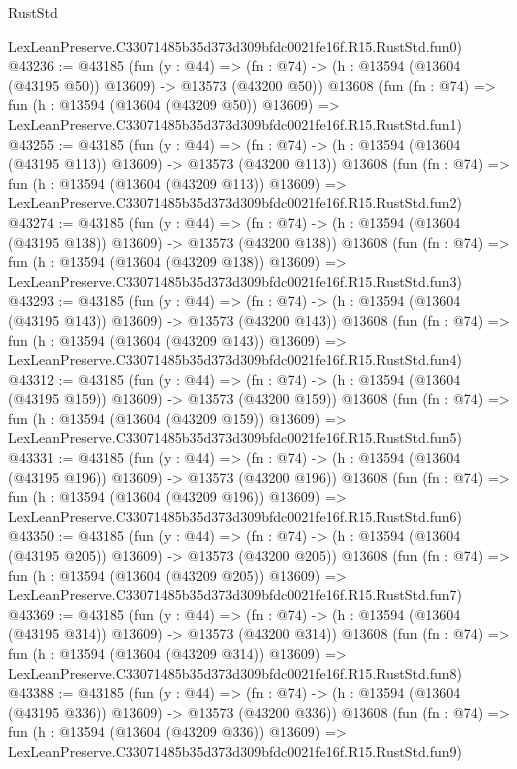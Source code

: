 \begin{lexlean}{RustStd}
\begin{coremodule}
    LexLeanPreserve.C33071485b35d373d309bfdc0021fe16f.R15.RustStd.fun0)
@43236 := @43185
    (fun (y : @44) =>
    (fn : @74) -> (h : @13594 (@13604 (@43195 @50)) @13609) -> @13573 (@43200 @50))
    @13608
    (fun (fn : @74) =>
    fun (h : @13594 (@13604 (@43209 @50)) @13609) =>
    LexLeanPreserve.C33071485b35d373d309bfdc0021fe16f.R15.RustStd.fun1)
@43255 := @43185
    (fun (y : @44) =>
    (fn : @74) -> (h : @13594 (@13604 (@43195 @113)) @13609) -> @13573 (@43200 @113))
    @13608
    (fun (fn : @74) =>
    fun (h : @13594 (@13604 (@43209 @113)) @13609) =>
    LexLeanPreserve.C33071485b35d373d309bfdc0021fe16f.R15.RustStd.fun2)
@43274 := @43185
    (fun (y : @44) =>
    (fn : @74) -> (h : @13594 (@13604 (@43195 @138)) @13609) -> @13573 (@43200 @138))
    @13608
    (fun (fn : @74) =>
    fun (h : @13594 (@13604 (@43209 @138)) @13609) =>
    LexLeanPreserve.C33071485b35d373d309bfdc0021fe16f.R15.RustStd.fun3)
@43293 := @43185
    (fun (y : @44) =>
    (fn : @74) -> (h : @13594 (@13604 (@43195 @143)) @13609) -> @13573 (@43200 @143))
    @13608
    (fun (fn : @74) =>
    fun (h : @13594 (@13604 (@43209 @143)) @13609) =>
    LexLeanPreserve.C33071485b35d373d309bfdc0021fe16f.R15.RustStd.fun4)
@43312 := @43185
    (fun (y : @44) =>
    (fn : @74) -> (h : @13594 (@13604 (@43195 @159)) @13609) -> @13573 (@43200 @159))
    @13608
    (fun (fn : @74) =>
    fun (h : @13594 (@13604 (@43209 @159)) @13609) =>
    LexLeanPreserve.C33071485b35d373d309bfdc0021fe16f.R15.RustStd.fun5)
@43331 := @43185
    (fun (y : @44) =>
    (fn : @74) -> (h : @13594 (@13604 (@43195 @196)) @13609) -> @13573 (@43200 @196))
    @13608
    (fun (fn : @74) =>
    fun (h : @13594 (@13604 (@43209 @196)) @13609) =>
    LexLeanPreserve.C33071485b35d373d309bfdc0021fe16f.R15.RustStd.fun6)
@43350 := @43185
    (fun (y : @44) =>
    (fn : @74) -> (h : @13594 (@13604 (@43195 @205)) @13609) -> @13573 (@43200 @205))
    @13608
    (fun (fn : @74) =>
    fun (h : @13594 (@13604 (@43209 @205)) @13609) =>
    LexLeanPreserve.C33071485b35d373d309bfdc0021fe16f.R15.RustStd.fun7)
@43369 := @43185
    (fun (y : @44) =>
    (fn : @74) -> (h : @13594 (@13604 (@43195 @314)) @13609) -> @13573 (@43200 @314))
    @13608
    (fun (fn : @74) =>
    fun (h : @13594 (@13604 (@43209 @314)) @13609) =>
    LexLeanPreserve.C33071485b35d373d309bfdc0021fe16f.R15.RustStd.fun8)
@43388 := @43185
    (fun (y : @44) =>
    (fn : @74) -> (h : @13594 (@13604 (@43195 @336)) @13609) -> @13573 (@43200 @336))
    @13608
    (fun (fn : @74) =>
    fun (h : @13594 (@13604 (@43209 @336)) @13609) =>
    LexLeanPreserve.C33071485b35d373d309bfdc0021fe16f.R15.RustStd.fun9)

\end{coremodule}
\end{lexlean}
